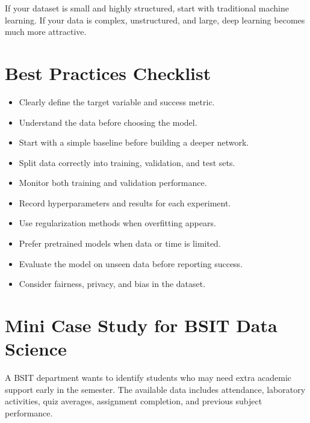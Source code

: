 \documentclass[11pt,a4paper]{article}
\begin{document}
\begin{conceptbox}
If your dataset is small and highly structured, start with traditional machine learning. If your data is complex, unstructured, and large, deep learning becomes much more attractive.
\end{conceptbox}

\section{Best Practices Checklist}

\begin{itemize}[leftmargin=*]
  \item Clearly define the target variable and success metric.
  \item Understand the data before choosing the model.
  \item Start with a simple baseline before building a deeper network.
  \item Split data correctly into training, validation, and test sets.
  \item Monitor both training and validation performance.
  \item Record hyperparameters and results for each experiment.
  \item Use regularization methods when overfitting appears.
  \item Prefer pretrained models when data or time is limited.
  \item Evaluate the model on unseen data before reporting success.
  \item Consider fairness, privacy, and bias in the dataset.
\end{itemize}

\section{Mini Case Study for BSIT Data Science}

\begin{definitionbox}[Scenario]
A BSIT department wants to identify students who may need extra academic support early in the semester. The available data includes attendance, laboratory activities, quiz averages, assignment completion, and previous subject performance.
\end{definitionbox}
\end{document}
